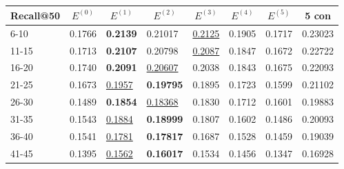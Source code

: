 \begin{table*}[]
    \begin{tabular}{|l|l|l|l|l|l|l||l|}
        \hline
        Recall@50 & \multicolumn{1}{c|}{$E^{(0)}$} & \multicolumn{1}{c|}{$E^{(1)}$} & \multicolumn{1}{c|}{$E^{(2)}$} & \multicolumn{1}{c|}{$E^{(3)}$} & \multicolumn{1}{c|}{$E^{(4)}$} & \multicolumn{1}{c||}{$E^{(5)}$} & \multicolumn{1}{c|}{5 con} \\ \hline
        6-10      & 0.1766                         & \textbf{0.2139}                & 0.21017                        & \underline{0.2125}             & 0.1905                         & 0.1717                          & 0.23023                    \\ \hline
        11-15     & 0.1713                         & \textbf{0.2107}                & 0.20798                        & \underline{0.2087}             & 0.1847                         & 0.1672                          & 0.22722                    \\ \hline
        16-20     & 0.1740                         & \textbf{0.2091}                & \underline{0.20607}            & 0.2038                         & 0.1843                         & 0.1675                          & 0.22093                    \\ \hline
        21-25     & 0.1673                         & \underline{0.1957}             & \textbf{0.19795}               & 0.1895                         & 0.1723                         & 0.1599                          & 0.21102                    \\ \hline
        26-30     & 0.1489                         & \textbf{0.1854}                & \underline{0.18368}            & 0.1830                         & 0.1712                         & 0.1601                          & 0.19883                    \\ \hline
        31-35     & 0.1543                         & \underline{0.1884}             & \textbf{0.18999}               & 0.1807                         & 0.1602                         & 0.1486                          & 0.20093                    \\ \hline
        36-40     & 0.1541                         & \underline{0.1781}             & \textbf{0.17817}               & 0.1687                         & 0.1528                         & 0.1459                          & 0.19039                    \\ \hline
        41-45     & 0.1395                         & \underline{0.1562}             & \textbf{0.16017}               & 0.1534                         & 0.1456                         & 0.1347                          & 0.16928                    \\ \hline

\end{tabular}
\end{table*}
